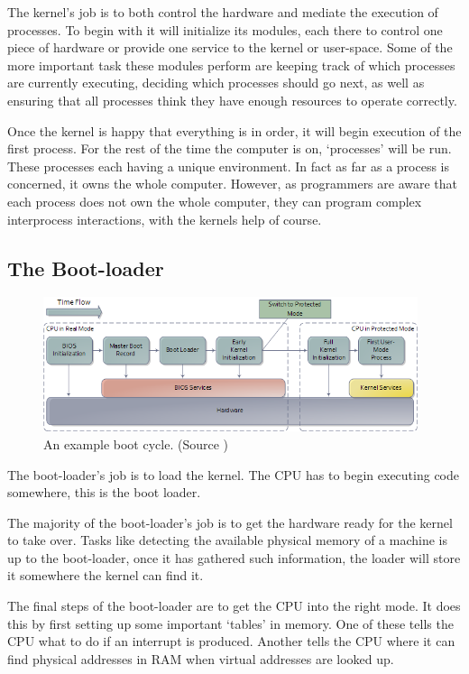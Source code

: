 \documentclass[a4paper]{report}
\begin{document}
The kernel's job is to both control the hardware and mediate the execution of processes. To begin with it will initialize its modules, each there to control one piece of hardware or provide one service to the kernel or user-space. Some of the more important task these modules perform are keeping track of which processes are currently executing, deciding which processes should go next, as well as ensuring that all processes think they have enough resources to operate correctly.

Once the kernel is happy that everything is in order, it will begin execution of the first process. For the rest of the time the computer is on, `processes' will be run. These processes each having a unique environment. In fact as far as a process is concerned, it owns the whole computer. However, as programmers are aware that each process does not own the whole computer, they can program complex interprocess interactions, with the kernels help of course.



\clearpage
\subsection{The Boot-loader}

\begin{figure}[ht]
\centering
\includegraphics[width=415px]{images/bootProcess.png}
\caption{An example boot cycle. (Source \cite{Boot})}
\label{fig:theloader}
\end{figure}

The boot-loader's job is to load the kernel. The CPU has to begin executing code somewhere, this is the boot loader.

The majority of the boot-loader's job is to get the hardware ready for the kernel to take over. Tasks like detecting the available physical memory of a machine is up to the boot-loader, once it has gathered such information, the loader will store it somewhere the kernel can find it.

The final steps of the boot-loader are to get the CPU into the right mode. It does this by first setting up some important `tables' in memory. One of these tells the CPU what to do if an interrupt is produced. Another tells the CPU where it can find physical addresses in RAM when virtual addresses are looked up.
\end{document}
